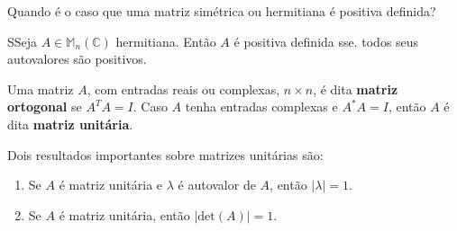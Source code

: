 \documentclass[12pt,a4paper]{article}
\begin{document}
Quando é o caso que uma matriz simétrica ou hermitiana é positiva definida? 

\begin{teorema}{}
 SSeja $A \in \mathbb{M}_n(\mathbb{C})$ hermitiana. Então $A$ é positiva definida sse. todos seus autovalores são positivos.
\end{teorema}

Uma matriz $A$, com entradas reais ou complexas, $n \times n$, é dita \textbf{matriz ortogonal} se $A^T A = I$. Caso $A$ tenha entradas complexas e $A^{\ast} A = I$, então $A$ é dita \textbf{matriz unitária}.

Dois resultados importantes sobre matrizes unitárias são:

\begin{enumerate}
\item Se $A$ é matriz unitária e $\lambda$ é autovalor de $A$, então $| \lambda | = 1$.
\item Se $A$ é matriz unitária, então $| \text{det}(A) | = 1$.
\end{enumerate}
\end{document}
